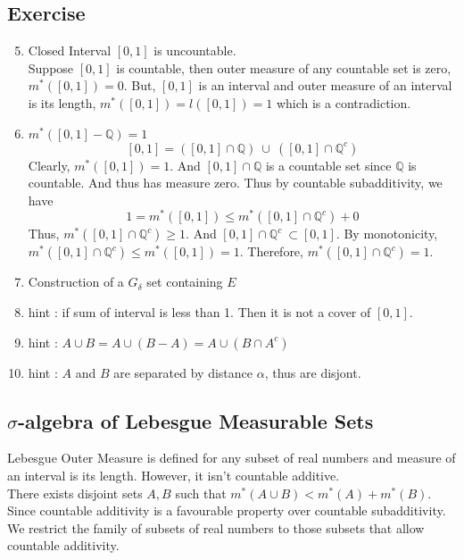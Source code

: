 \subsection{Exercise}
\begin{enumerate}
	\setcounter{enumi}{4}
\item Closed Interval $[0,1]$ is uncountable.\\
	Suppose $[0,1]$ is countable, then outer measure of any countable set is zero, $m^\ast([0,1]) = 0$. But, $[0,1]$ is an interval and outer measure of an interval is its length, $m^\ast([0,1]) = l([0,1]) = 1$ which is a contradiction.
\item $m^\ast([0,1] - \mathbb{Q}) = 1$
	$$[0,1] = \left( [0,1] \cap \mathbb{Q} \right)\ \cup\ \left( [0,1]\cap \mathbb{Q}^c \right)$$
	Clearly, $m^\ast([0,1]) = 1$. And $[0,1] \cap \mathbb{Q}$ is a countable set since $\mathbb{Q}$ is countable. And thus has measure zero. Thus by countable subadditivity, we have
	$$1 = m^\ast([0,1]) \le m^\ast([0,1] \cap \mathbb{Q}^c) + 0$$
		Thus, $m^\ast([0,1] \cap \mathbb{Q}^c) \ge 1$. And $[0,1] \cap \mathbb{Q}^c\ \subset [0,1]$. By monotonicity, $m^\ast([0,1] \cap \mathbb{Q}^c) \le m^\ast([0,1]) = 1$. Therefore, $m^\ast([0,1] \cap \mathbb{Q}^c) = 1$.
	\item Construction of a $G_\delta$ set containing $E$ %
	\item hint : if sum of interval is less than 1. Then it is not a cover of $[0,1]$.
	\item hint : $A \cup B = A \cup (B-A) = A \cup (B \cap A^c)$
	\item hint : $A$ and $B$ are separated by distance $\alpha$, thus are disjont.
\end{enumerate}

\subsection{$\sigma$-algebra of Lebesgue Measurable Sets}
	Lebesgue Outer Measure is defined for any subset of real numbers and measure of an interval is its length. However, it isn't countable additive.\\

	There exists disjoint sets $A,B$ such that $m^\ast(A\cup B) < m^\ast(A)+m^\ast(B)$.\\
	
	Since countable additivity is a favourable property over countable subadditivity. We restrict the family of subsets of real numbers to those subsets that allow countable additivity.
	
